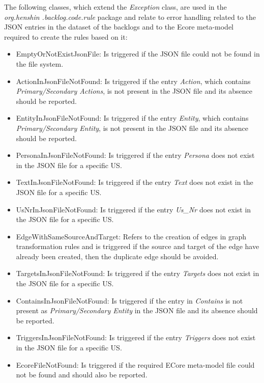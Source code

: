 The following classes, which extend the \textit{Exception} class, are used in the \textit{org.henshin .backlog.code.rule} package and relate to error handling related to the JSON entries in the dataset of the backlogs and to the Ecore meta-model required to create the rules based on it:
\begin{itemize}
	\item EmptyOrNotExistJsonFile: Is triggered if the JSON file could not be found in the file system.
	
	\item ActionInJsonFileNotFound: Is triggered if the entry \textit{Action}, which contains \textit{Primary/Secondary Actions}, is not present in the JSON file and its absence should be reported.
	
	\item EntityInJsonFileNotFound: Is triggered if the entry \textit{Entity}, which contains \textit{Primary/Secondary Entity}, is not present in the JSON file and its absence should be reported.
	
	\item PersonaInJsonFileNotFound: Is triggered if the entry \textit{Persona} does not exist in the JSON file for a specific US.
	
	\item TextInJsonFileNotFound: Is triggered if the entry \textit{Text} does not exist in the JSON file for a specific US. 
	
	\item UsNrInJsonFileNotFound: Is triggered if the entry \textit{Us\_Nr} does not exist in the JSON file for a specific US.

	\item EdgeWithSameSourceAndTarget: Refers to the creation of edges in graph transformation rules and is triggered if the source and target of the edge have already been created, then the duplicate edge should be avoided.
		
	\item TargetsInJsonFileNotFound: Is triggered if the entry \textit{Targets} does not exist in the JSON file for a specific US.
	
	\item ContainsInJsonFileNotFound: Is triggered if the entry in \textit{Contains} is not present as \textit{Primary/Secondary Entity} in the JSON file and its absence should be reported.
	
	\item TriggersInJsonFileNotFound: Is triggered if the entry \textit{Triggers} does not exist in the JSON file for a specific US. 
	
	\item EcoreFileNotFound: Is triggered if the required ECore meta-model file could not be found and should also be reported.
\end{itemize}
